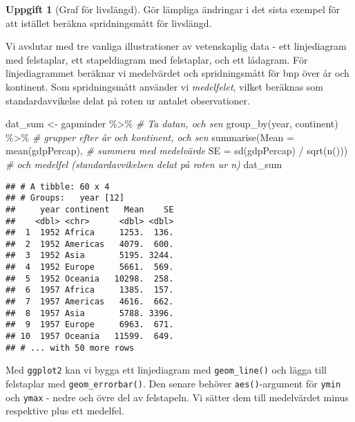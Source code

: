 \documentclass[
]{book}
\newenvironment{Shaded}{\begin{snugshade}}{\end{snugshade}}
\newcommand{\AttributeTok}[1]{\textcolor[rgb]{0.77,0.63,0.00}{#1}}
\newcommand{\CommentTok}[1]{\textcolor[rgb]{0.56,0.35,0.01}{\textit{#1}}}
\newcommand{\FunctionTok}[1]{\textcolor[rgb]{0.00,0.00,0.00}{#1}}
\newcommand{\NormalTok}[1]{#1}
\newcommand{\OtherTok}[1]{\textcolor[rgb]{0.56,0.35,0.01}{#1}}
\newcommand{\SpecialCharTok}[1]{\textcolor[rgb]{0.00,0.00,0.00}{#1}}
\theoremstyle{definition}
\theoremstyle{definition}
\theoremstyle{definition}
\newtheorem{exercise}{Uppgift}[chapter]
\theoremstyle{definition}
\theoremstyle{remark}
\begin{document}
\begin{exercise}[Graf för livslängd]
Gör lämpliga ändringar i det sista exempel för att istället beräkna spridningsmått för livslängd.
\end{exercise}

Vi avslutar med tre vanliga illustrationer av vetenskaplig data - ett linjediagram med felstaplar, ett stapeldiagram med felstaplar, och ett lådagram. För linjediagrammet beräknar vi medelvärdet och spridningsmått för bnp över år och kontinent. Som spridningsmått använder vi \emph{medelfelet}, vilket beräknas som standardavvikelse delat på roten ur antalet observationer.

\begin{Shaded}
\begin{Highlighting}[]
\NormalTok{dat\_sum }\OtherTok{\textless{}{-}}\NormalTok{ gapminder }\SpecialCharTok{\%\textgreater{}\%}                         \CommentTok{\# Ta datan, och sen}
  \FunctionTok{group\_by}\NormalTok{(year, continent) }\SpecialCharTok{\%\textgreater{}\%}                  \CommentTok{\# grupper efter år och kontinent, och sen}
  \FunctionTok{summarise}\NormalTok{(}\AttributeTok{Mean =} \FunctionTok{mean}\NormalTok{(gdpPercap),              }\CommentTok{\# summera med medelvärde}
            \AttributeTok{SE =} \FunctionTok{sd}\NormalTok{(gdpPercap) }\SpecialCharTok{/} \FunctionTok{sqrt}\NormalTok{(}\FunctionTok{n}\NormalTok{()))      }\CommentTok{\# och medelfel (standardavvikelsen delat på roten ur n)}
\NormalTok{dat\_sum}
\end{Highlighting}
\end{Shaded}

\begin{verbatim}
## # A tibble: 60 x 4
## # Groups:   year [12]
##     year continent   Mean    SE
##    <dbl> <chr>      <dbl> <dbl>
##  1  1952 Africa     1253.  136.
##  2  1952 Americas   4079.  600.
##  3  1952 Asia       5195. 3244.
##  4  1952 Europe     5661.  569.
##  5  1952 Oceania   10298.  258.
##  6  1957 Africa     1385.  157.
##  7  1957 Americas   4616.  662.
##  8  1957 Asia       5788. 3396.
##  9  1957 Europe     6963.  671.
## 10  1957 Oceania   11599.  649.
## # ... with 50 more rows
\end{verbatim}

Med \texttt{ggplot2} kan vi bygga ett linjediagram med \texttt{geom\_line()} och lägga till felstaplar med \texttt{geom\_errorbar()}. Den senare behöver \texttt{aes()}-argument för \texttt{ymin} och \texttt{ymax} - nedre och övre del av felstapeln. Vi sätter dem till medelvärdet minus respektive plus ett medelfel.
\end{document}
